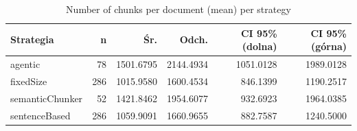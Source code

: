 \begin{table}[H]
    \centering
    \caption{Number of chunks per document (mean) per strategy}
    \small
    \begin{tabular}{@{}lrrrrr@{}}
        \toprule
        \textbf{Strategia} & \textbf{n} & \textbf{Śr.} & \textbf{Odch.} & \textbf{CI 95\% (dolna)} & \textbf{CI 95\% (górna)} \\
        \midrule
        agentic & 78 & 1501.6795 & 2144.4934 & 1051.0128 & 1989.0128 \\
        fixedSize & 286 & 1015.9580 & 1600.4534 & 846.1399 & 1190.2517 \\
        semanticChunker & 52 & 1421.8462 & 1954.6077 & 932.6923 & 1964.0385 \\
        sentenceBased & 286 & 1059.9091 & 1660.9655 & 882.7587 & 1240.5000 \\
        \bottomrule
    \end{tabular}
\end{table}
